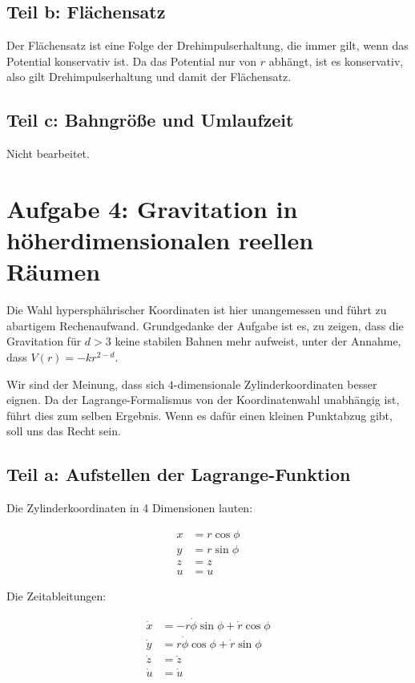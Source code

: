 \documentclass[a4paper,german,12pt,smallheadings]{scrartcl}
\begin{document}
\subsection*{Teil b: Flächensatz}

Der Flächensatz ist eine Folge der Drehimpulserhaltung, die immer gilt, wenn
das Potential konservativ ist. Da das Potential nur von $r$ abhängt, ist es
konservativ, also gilt Drehimpulserhaltung und damit der Flächensatz.

\subsection*{Teil c: Bahngröße und Umlaufzeit}

Nicht bearbeitet.

\section*{Aufgabe 4: Gravitation in höherdimensionalen reellen Räumen}

Die Wahl hypersphährischer Koordinaten ist hier unangemessen und führt zu
abartigem Rechenaufwand. Grundgedanke der Aufgabe ist es, zu zeigen, dass die
Gravitation für $d > 3$ keine stabilen Bahnen mehr aufweist, unter der Annahme,
dass $V(r) = -kr^{2-d}$.

Wir sind der Meinung, dass sich $4$-dimensionale Zylinderkoordinaten besser
eignen. Da der Lagrange-Formalismus von der Koordinatenwahl unabhängig ist,
führt dies zum selben Ergebnis. Wenn es dafür einen kleinen Punktabzug gibt,
soll uns das Recht sein.

\subsection*{Teil a: Aufstellen der Lagrange-Funktion}

Die Zylinderkoordinaten in 4 Dimensionen lauten:

\begin{align*}
  x &= r \cos \phi \\
  y &= r \sin \phi \\
  z &= z \\
  u &= u
\end{align*}

Die Zeitableitungen:

\begin{align*}
  \dot{x} &= -r \dot{\phi} \sin \phi + \dot{r} \cos \phi\\
  \dot{y} &= r \dot{\phi} \cos \phi + \dot{r} \sin \phi\\
  \dot{z} &= \dot{z} \\
  \dot{u} &= \dot{u}
\end{align*}
\end{document}
